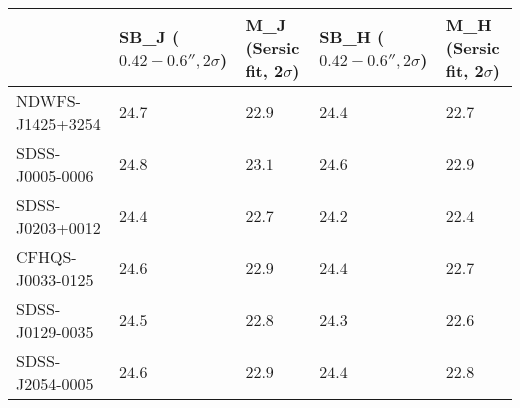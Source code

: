 \begin{tabular}{lllll}
\toprule
{} & SB_J ($0.42-0.6'', 2\sigma$) & M_J (Sersic fit, 2$\sigma$) & SB_H ($0.42-0.6'', 2\sigma$) & M_H (Sersic fit, 2$\sigma$) \\
\midrule
NDWFS-J1425+3254 &                       $24.7$ &                      $22.9$ &                       $24.4$ &                      $22.7$ \\
SDSS-J0005-0006  &                       $24.8$ &                      $23.1$ &                       $24.6$ &                      $22.9$ \\
SDSS-J0203+0012  &                       $24.4$ &                      $22.7$ &                       $24.2$ &                      $22.4$ \\
CFHQS-J0033-0125 &                       $24.6$ &                      $22.9$ &                       $24.4$ &                      $22.7$ \\
SDSS-J0129-0035  &                       $24.5$ &                      $22.8$ &                       $24.3$ &                      $22.6$ \\
SDSS-J2054-0005  &                       $24.6$ &                      $22.9$ &                       $24.4$ &                      $22.8$ \\
\bottomrule
\end{tabular}

